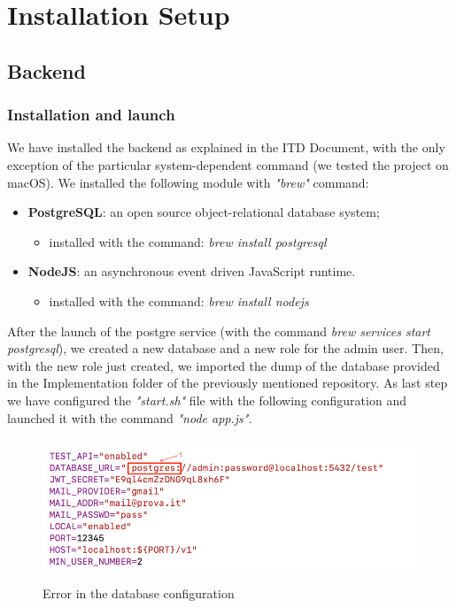 \documentclass{article}
\begin{document}
\newpage
\section{Installation Setup}
\subsection{Backend }
\subsubsection{Installation and launch}
	We have installed the backend as explained in the ITD Document, with the only exception of the particular system-dependent command (we tested the project on macOS).\newline
	We installed the following module with \textit{"brew"} command:
	
	\begin{itemize}
		\item \textbf{PostgreSQL}: an open source object-relational database system;
		\begin{itemize}
			\item	installed with the command: \textit{brew install postgresql}
		\end{itemize}
		\item \textbf{NodeJS}: an asynchronous event driven JavaScript runtime.
		\begin{itemize}
			\item	installed with the command: \textit{brew install nodejs}
		\end{itemize}
	\end{itemize}
	
	After the launch of the postgre service (with the command \textit{brew services start postgresql}), we created a new database and a new role for the admin user. \newline
	Then, with the new role just created, we imported the dump of the database provided in the Implementation folder of the previously mentioned repository.
	As last step we have configured the \textit{"start.sh"} file with the following configuration and launched it with the command \textit{"node app.js"}.
	\begin{figure}[h!]
		\centering
		\includegraphics[height=4.25cm,keepaspectratio]{Figures/error1}
		\caption{Error in the database configuration}
	\end{figure}
	
\end{document}
